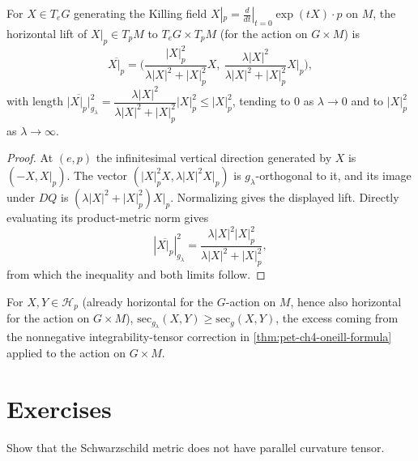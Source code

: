 \begin{proposition}
  \label{prop:pet-ch4-berger-cheeger-horizontal-lift}
  For $X\in T_eG$ generating the Killing field $X|_p=\tfrac d{dt}|_{t=0}\exp(tX)\cdot p$
  on $M$, the horizontal lift of $X|_p\in T_pM$ to $T_eG\times T_pM$ (for the
  action on $G\times M$) is
  \[
    \overline{X|_p}=\Big(\frac{|X|_p^2}{\lambda|X|^2+|X|_p^2}X,\ \frac{\lambda|X|^2}{\lambda|X|^2+|X|_p^2}X|_p\Big),
  \]
  with length $\big|\overline{X|_p}\big|_{g_\lambda}^2=\dfrac{\lambda|X|^2}{\lambda|X|^2+|X|_p^2}|X|_p^2\le|X|_p^2$,
  tending to $0$ as $\lambda\to0$ and to $|X|_p^2$ as $\lambda\to\infty$.
\end{proposition}
\begin{proof}
  \sketch
  At $(e,p)$ the infinitesimal vertical direction generated by $X$ is
  $(-X,X|_p)$. The vector
  $(|X|_p^2X,\lambda|X|^2X|_p)$ is $g_\lambda$-orthogonal to it, and
  its image under $DQ$ is
  $(\lambda|X|^2+|X|_p^2)X|_p$. Normalizing gives the displayed lift. Directly
  evaluating its product-metric norm gives
  \[
    |\overline{X|_p}|_{g_\lambda}^2
    =\frac{\lambda|X|^2|X|_p^2}{\lambda|X|^2+|X|_p^2},
  \]
  from which the inequality and both limits follow.
\end{proof}


\begin{remark}
  \label{rem:pet-ch4-berger-cheeger-curvature-increase}
  For $X,Y\in\mathcal H_p$ (already horizontal for the $G$-action on $M$, hence
  also horizontal for the action on $G\times M$),
  $\mathrm{sec}_{g_\lambda}(X,Y)\ge\mathrm{sec}_g(X,Y)$, the excess coming from
  the nonnegative integrability-tensor correction in
  \cref{thm:pet-ch4-oneill-formula} applied to the action on $G\times M$.
\end{remark}

\section{Exercises}

\begin{remark}
  \label{rem:pet-ch4-ex-1}
  Show that the Schwarzschild metric does not have parallel curvature tensor.
\end{remark}

